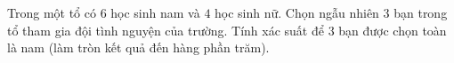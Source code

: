 \begin{bt}%
	Trong một tổ có $6$ học sinh nam và $4$ học sinh nữ. Chọn ngẫu nhiên $3$ bạn trong tổ tham
	gia đội tình nguyện của trường. Tính xác suất để $3$ bạn được chọn toàn là nam (làm tròn kết quả đến hàng phần trăm).
\end{bt}

